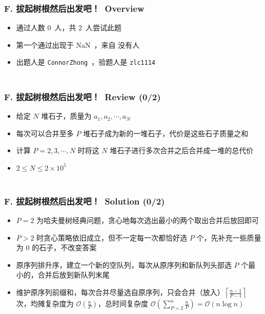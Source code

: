\documentclass[notheorems]{beamer}
\newcommand{\zhProbF}{拔起树根然后出发吧！}\newcommand{\DiffF}{Medium}	\newcommand{\AuthProbF}{\texttt{ConnorZhong}}	\newcommand{\TestProbF}{\texttt{zlc1114}}
\newcommand{\TBD}{NaN}	\newcommand{\NONE}{没有人}	\newcommand{\INF}{$\infty$} \newcommand{\Someone}{佚名}
\newcommand{\AccInProbF}{0}	\newcommand{\SubInProbF}{2}	\newcommand{\RatInProbF}{00.00\%}
\newcommand{\FirPenInProbF}{\TBD}		\newcommand{\FirPerInProbF}{\NONE}
\begin{document}
\begin{frame}[label = ProbF]
\frametitle{\\ F. \zhProbF\ Overview}
\begin{spacing}{2.0} \large
\begin{itemize}
\item 通过人数 \AccInProbF\ 人，共 \SubInProbF\ 人尝试此题
\item 第一个通过出现于 \FirPenInProbF\ ，来自 \FirPerInProbF\ 
\item 出题人是 \AuthProbF\ ，验题人是 \TestProbF\
\end{itemize}
\end{spacing}
\end{frame}
\begin{frame}
\frametitle{\\ F. \zhProbF\ Review (\AccInProbF/\SubInProbF)}
\begin{spacing}{2.0} \large
\begin{itemize}
\item 给定 $N$ 堆石子，质量为 $a_1, a_2, \cdots, a_N$
\item 每次可以合并至多 $P$ 堆石子成为新的一堆石子，代价是这些石子质量之和
\item 计算 $P = 2, 3, \cdots, N$ 时将这 $N$ 堆石子进行多次合并之后合并成一堆的总代价
\item $2 \leq N \leq 2 \times 10^5$
\end{itemize}
\end{spacing}
\end{frame}
\begin{frame}
\frametitle{\\ F. \zhProbF\ Solution (\AccInProbF/\SubInProbF)}
\begin{spacing}{1.5} \large
\begin{itemize}[<+->]
\item $P = 2$ 为哈夫曼树经典问题，贪心地每次选出最小的两个取出合并后放回即可
\item $P > 2$ 时贪心策略依旧成立，但不一定每一次都恰好选 $P$ 个，先补充一些质量为 $0$ 的石子，不改变答案
\item 原序列排升序，建立一个新的空队列，每次从原序列和新队列头部选 $P$ 个最小的，合并后放到新队列末尾
\item 维护原序列前缀和，每次合并尽量选自原序列，只会合并（放入）$\left\lceil\frac{n - 1}{P - 1}\right\rceil$ 次，均摊复杂度为 $\mathcal{O}(\frac{n}{P})$，总时间复杂度 $\mathcal{O}(\sum_{P = 2}^{n}{\frac{n}{P}}) = \mathcal{O}(n \log n)$
\end{itemize}
\end{spacing}
\end{frame}
\end{document}

